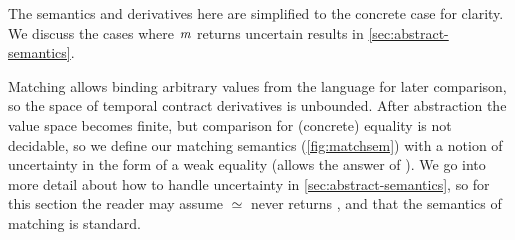 The semantics and derivatives here are simplified to the concrete case for clarity.
%
We discuss the cases where $\mathit{m}$ returns uncertain results in \autoref{sec:abstract-semantics}.

Matching allows binding arbitrary values from the language for later comparison, so the space of temporal contract derivatives is unbounded.
%
After abstraction the value space becomes finite, but comparison for (concrete) equality is not decidable, so we define our matching semantics (\autoref{fig:matchsem}) with a notion of uncertainty in the form of a weak equality (allows the answer of \may).
%
We go into more detail about how to handle uncertainty in \autoref{sec:abstract-semantics}, so for this section the reader may assume $\simeq$ never returns \may, and that the semantics of matching is standard.

%
%

